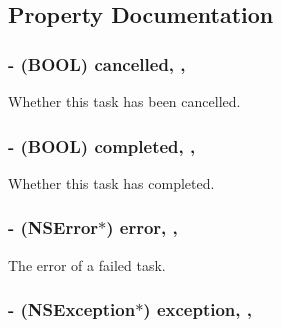 \subsection{Property Documentation}
\hypertarget{interface_b_f_task_a0519b52112586cbfcccffca6bade7bc1}{
\subsubsection[{cancelled}]{\setlength{\rightskip}{0pt plus 5cm}-\/ (B\-O\-O\-L) cancelled\hspace{0.3cm}{\ttfamily [read]}, {\ttfamily [nonatomic]}, {\ttfamily [assign]}}}\label{interface_b_f_task_a0519b52112586cbfcccffca6bade7bc1}
Whether this task has been cancelled. \hypertarget{interface_b_f_task_a8c0d88b65b10e8f6dd5378ad3d9bc6c3}{
\subsubsection[{completed}]{\setlength{\rightskip}{0pt plus 5cm}-\/ (B\-O\-O\-L) completed\hspace{0.3cm}{\ttfamily [read]}, {\ttfamily [nonatomic]}, {\ttfamily [assign]}}}\label{interface_b_f_task_a8c0d88b65b10e8f6dd5378ad3d9bc6c3}
Whether this task has completed. \hypertarget{interface_b_f_task_a9e3b5f8fc6e1754500bc7241a04c2cc6}{
\subsubsection[{error}]{\setlength{\rightskip}{0pt plus 5cm}-\/ (N\-S\-Error$\ast$) error\hspace{0.3cm}{\ttfamily [read]}, {\ttfamily [nonatomic]}, {\ttfamily [strong]}}}\label{interface_b_f_task_a9e3b5f8fc6e1754500bc7241a04c2cc6}
The error of a failed task. \hypertarget{interface_b_f_task_ab21a391a52929bd83d374c32c1b54ebf}{
\subsubsection[{exception}]{\setlength{\rightskip}{0pt plus 5cm}-\/ (N\-S\-Exception$\ast$) exception\hspace{0.3cm}{\ttfamily [read]}, {\ttfamily [nonatomic]}, {\ttfamily [strong]}}}\label{interface_b_f_task_ab21a391a52929bd83d374c32c1b54ebf}
